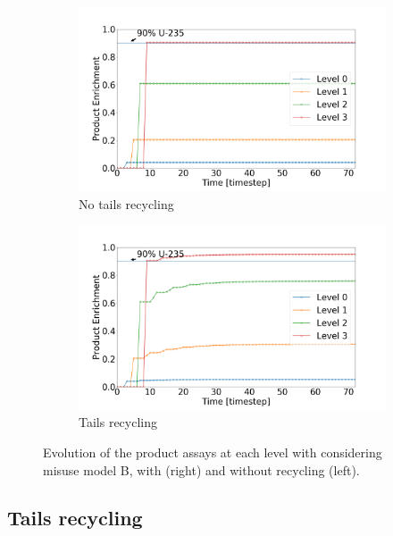 \begin{figure}[h!]
    \centering
    \begin{subfigure}[t]{0.45\textwidth}
        \centering
        \includegraphics[scale=0.17]{NR_case2}
        \caption{No tails recycling}
        \label{sfig:case2_NR}
    \end{subfigure}%
    \begin{subfigure}[t]{0.45\textwidth}
        \centering
        \includegraphics[scale=0.17]{R_case2}
        \caption{Tails recycling}
        \label{sfig:case2_R}
    \end{subfigure}
    \caption{Evolution of the product assays at each level with considering
    misuse model B, with (right) and without recycling (left).}
    \label{fig:case2}
\end{figure}

\subsection{Tails recycling}

